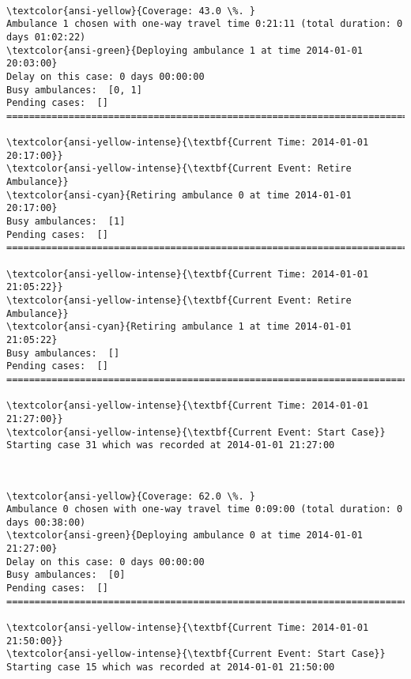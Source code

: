 \documentclass[11pt]{article}
\begin{document}
    \begin{center}
    \end{center}
    { \hspace*{\fill} \\}
    
    \begin{Verbatim}[commandchars=\\\{\}]
\textcolor{ansi-yellow}{Coverage: 43.0 \%. }
Ambulance 1 chosen with one-way travel time 0:21:11 (total duration: 0 days 01:02:22)
\textcolor{ansi-green}{Deploying ambulance 1 at time 2014-01-01 20:03:00}
Delay on this case: 0 days 00:00:00
Busy ambulances:  [0, 1]
Pending cases:  []
========================================================================

\textcolor{ansi-yellow-intense}{\textbf{Current Time: 2014-01-01 20:17:00}}
\textcolor{ansi-yellow-intense}{\textbf{Current Event: Retire Ambulance}}
\textcolor{ansi-cyan}{Retiring ambulance 0 at time 2014-01-01 20:17:00}
Busy ambulances:  [1]
Pending cases:  []
========================================================================

\textcolor{ansi-yellow-intense}{\textbf{Current Time: 2014-01-01 21:05:22}}
\textcolor{ansi-yellow-intense}{\textbf{Current Event: Retire Ambulance}}
\textcolor{ansi-cyan}{Retiring ambulance 1 at time 2014-01-01 21:05:22}
Busy ambulances:  []
Pending cases:  []
========================================================================

\textcolor{ansi-yellow-intense}{\textbf{Current Time: 2014-01-01 21:27:00}}
\textcolor{ansi-yellow-intense}{\textbf{Current Event: Start Case}}
Starting case 31 which was recorded at 2014-01-01 21:27:00

    \end{Verbatim}

    \begin{center}
    \end{center}
    { \hspace*{\fill} \\}
    
    \begin{Verbatim}[commandchars=\\\{\}]
\textcolor{ansi-yellow}{Coverage: 62.0 \%. }
Ambulance 0 chosen with one-way travel time 0:09:00 (total duration: 0 days 00:38:00)
\textcolor{ansi-green}{Deploying ambulance 0 at time 2014-01-01 21:27:00}
Delay on this case: 0 days 00:00:00
Busy ambulances:  [0]
Pending cases:  []
========================================================================

\textcolor{ansi-yellow-intense}{\textbf{Current Time: 2014-01-01 21:50:00}}
\textcolor{ansi-yellow-intense}{\textbf{Current Event: Start Case}}
Starting case 15 which was recorded at 2014-01-01 21:50:00

    \end{Verbatim}
\end{document}
